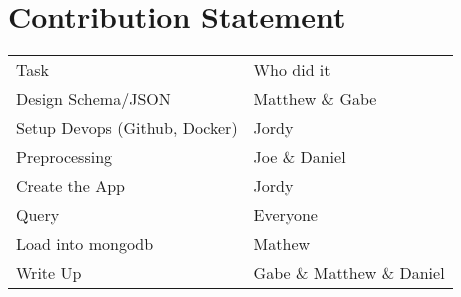 \documentclass[11pt]{article}
\begin{document}
\section{Contribution Statement}
\label{sec:org216a8eb}
\begin{center}
\begin{tabular}{ll}
\hline
Task & Who did it\\
Design Schema/JSON & Matthew \& Gabe\\
Setup Devops (Github, Docker) & Jordy\\
Preprocessing & Joe \& Daniel\\
Create the App & Jordy\\
Query & Everyone\\
Load into mongodb & Mathew\\
Write Up & Gabe \& Matthew \& Daniel\\
\hline
\end{tabular}
\end{center}
\end{document}
